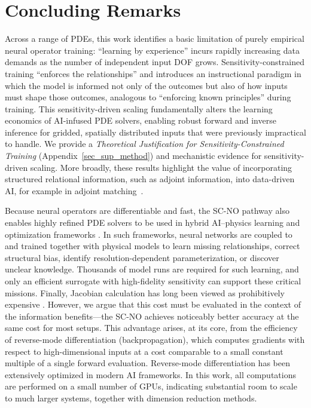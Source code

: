 \section*{Concluding Remarks}

Across a range of PDEs, this work identifies a basic limitation of purely empirical neural operator training: ``learning by experience'' incurs rapidly increasing data demands as the number of independent input DOF grows. Sensitivity-constrained training ``enforces the relationships'' and introduces an instructional paradigm in which the model is informed not only of the outcomes but also of how inputs must shape those outcomes, analogous to ``enforcing known principles'' during training. This sensitivity-driven scaling fundamentally alters the learning economics of AI-infused PDE solvers, enabling robust forward and inverse inference for gridded, spatially distributed inputs that were previously impractical to handle. We provide a \textit{Theoretical Justification for Sensitivity-Constrained Training} (Appendix~\ref{sec_sup_method}) and mechanistic evidence for sensitivity-driven scaling. More broadly, these results highlight the value of incorporating structured relational information, such as adjoint information, into data-driven AI, for example in adjoint matching~\cite{pmlr-v267-havens25a}.


Because neural operators are differentiable and fast, the SC-NO pathway also enables highly refined PDE solvers to be used in hybrid AI--physics learning and optimization frameworks \cite{shen2023differentiable, StroferXiao2021, zong2026mathematics}. In such frameworks, neural networks are coupled to and trained together with physical models to learn missing relationships, correct structural bias, identify resolution-dependent parameterization, or discover unclear knowledge. Thousands of model runs are required for such learning, and only an efficient surrogate with high-fidelity sensitivity can support these critical missions. Finally, Jacobian calculation has long been viewed as prohibitively expensive \cite{cao2025derivative}. However, we argue that this cost must be evaluated in the context of the information benefits—the SC-NO achieves noticeably better accuracy at the same cost for most setups. This advantage arises, at its core, from the efficiency of reverse-mode differentiation (backpropagation), which computes gradients with respect to high-dimensional inputs at a cost comparable to a small constant multiple of a single forward evaluation. Reverse-mode differentiation has been extensively optimized in modern AI frameworks. In this work, all computations are performed on a small number of GPUs, indicating substantial room to scale to much larger systems, together with dimension reduction methods.


